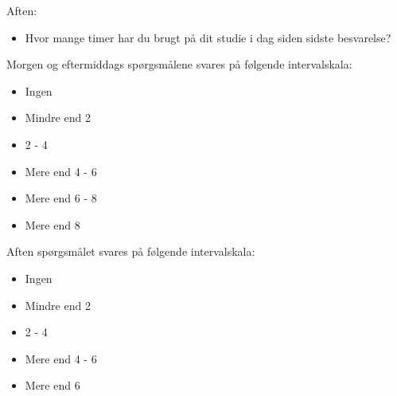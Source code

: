 \noindent Aften: 
\begin{itemize} 
	\item Hvor mange timer har du brugt på dit studie i dag siden sidste besvarelse? 
\end{itemize}

\noindent Morgen og eftermiddags spørgsmålene svares på følgende intervalskala: 
\begin{itemize}
	\item Ingen
	\item Mindre end 2
	\item 2 - 4
	\item Mere end 4 - 6 
	\item Mere end 6 - 8
	\item Mere end 8 
\end{itemize}

\noindent Aften spørgsmålet svares på følgende intervalskala: 
\begin{itemize}
	\item Ingen
	\item Mindre end 2
	\item 2 - 4
	\item Mere end 4 - 6 
	\item Mere end 6
\end{itemize}